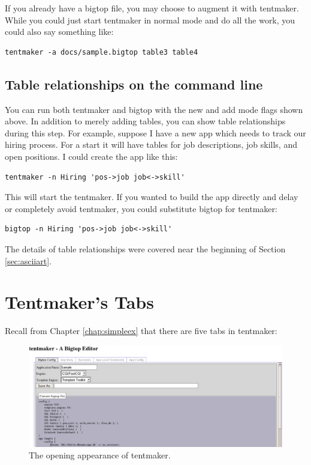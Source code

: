 If you already have a bigtop file, you may choose to augment it with
tentmaker.  While you could just start tentmaker in normal mode and do
all the work, you could also say something like:

\begin{verbatim}
tentmaker -a docs/sample.bigtop table3 table4
\end{verbatim}

\subsection*{Table relationships on the command line}

You can run both tentmaker and bigtop with the new and add mode
flags shown above.  In addition to merely adding tables, you can show
table relationships during this step.  For example, suppose I have a
new app which needs to track our hiring process.  For a start it will have
tables for job descriptions, job skills, and open positions.  I could
create the app like this:

\begin{verbatim}
tentmaker -n Hiring 'pos->job job<->skill'
\end{verbatim}

This will start the tentmaker.  If you wanted to build the app directly
and delay or completely avoid tentmaker, you could substitute bigtop
for tentmaker:

\begin{verbatim}
bigtop -n Hiring 'pos->job job<->skill'
\end{verbatim}

The details of table relationships were covered near the beginning
of Section \ref{sec:asciiart}.

\section{Tentmaker's Tabs}

Recall from Chapter \ref{chap:simpleex} that there are five tabs in
tentmaker:

\begin{figure}
\includegraphics[width=6in]{tentopening}
\caption{The opening appearance of tentmaker.}
\label{fig:tentopening}
\end{figure}

